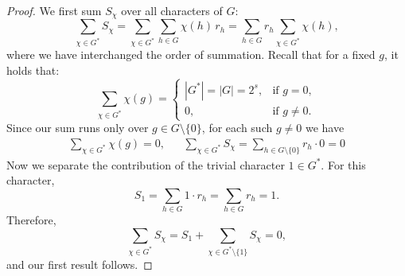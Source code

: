 \documentclass[12pt,twoside,]{amsart}
\theoremstyle{plain}
\theoremstyle{definition}
\begin{document}
\begin{proof}
We first sum $S_{\chi}$ over all characters of $G$:
\[
\sum_{\chi \in G^{\ast}} S_{\chi}
= \sum_{\chi \in G^{\ast}} \sum_{h \in G } \chi(h)\, r_h
= \sum_{h \in G } r_h \sum_{\chi \in G^{\ast}} \chi(h),
\]
where we have interchanged the order of summation. Recall that for a fixed $g$, it holds that:
\[
\sum_{\chi \in G^{\ast} 
} \chi(g)
=
\begin{cases}
|G^{\ast}| = |G| = 2^s, & \text{if } g = 0,\\[4pt]
0, & \text{if } g \neq 0.
\end{cases}
\]
Since our sum runs only over $g \in G \setminus \{0\}$, for each such $g \neq 0$ we have
\begin{align*}
\sum_{\chi \in G^{\ast}
} \chi(g) = 0,
&&
\sum_{\chi \in G^{\ast}
} S_{\chi}
= \sum_{h \in G \setminus \{0\}} r_h \cdot 0
= 0
\end{align*}
Now we separate the contribution of the trivial character $1 \in G^{\ast}$. For this character,
\[
S_{1} = \sum_{h \in G } 1 \cdot r_h
= \sum_{h \in G } r_h
= 1.
\]
Therefore,
\[
\sum_{\chi \in G^{\ast}} S_{\chi} 
=
S_{1}
+
\sum_{\chi \in G^{\ast} \setminus \{1\}} S_{\chi} 
= 0,
\]
and our first result follows.


\end{proof}
\end{document}
